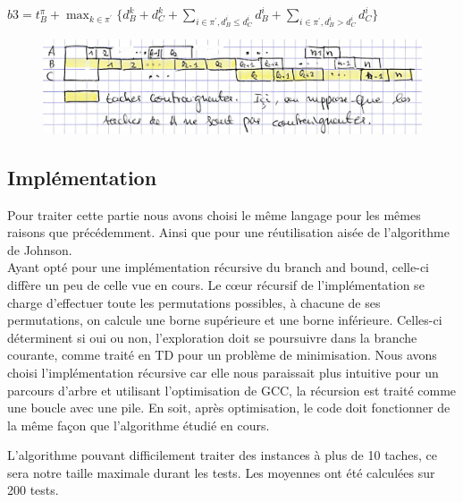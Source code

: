 \documentclass[12pt]{article}
\begin{document}
\begin{center}
 $b3 = t_B^\pi + \displaystyle\max_{k \in \pi^\prime}\{d_B^k + d_C^k + \displaystyle\sum_{i \in \pi^\prime,d_B^i \le d_C^i} d_B^i + \displaystyle\sum_{i \in \pi^\prime,d_B^i > d_C^i} d_C^i\} $\\
\end{center}

\begin{figure}[!ht]
\centering
\centerline{\includegraphics[scale=1]{11.jpg}}
\caption{}
\label{cas41}
\end{figure}

\subsection{Implémentation}

Pour traiter cette partie nous avons choisi le même langage pour les mêmes raisons que précédemment. Ainsi que pour une réutilisation aisée de l'algorithme de Johnson.\\

Ayant opté pour une implémentation récursive du branch and bound, celle-ci diffère un peu de celle vue en cours. Le cœur récursif de l'implémentation se charge d'effectuer toute les permutations possibles, à chacune de ses permutations, on calcule une borne supérieure et une borne inférieure. Celles-ci déterminent si oui ou non, l'exploration doit se poursuivre dans la branche courante, comme traité en TD pour un problème de minimisation. Nous avons choisi l'implémentation récursive car elle nous paraissait plus intuitive pour un parcours d'arbre et utilisant l'optimisation de GCC, la récursion est traité comme une boucle avec une pile. En soit, après optimisation, le code doit fonctionner de la même façon que l'algorithme étudié en cours. 

L'algorithme pouvant difficilement traiter des instances à plus de 10 taches, ce sera notre taille maximale durant les tests. Les moyennes ont été calculées sur 200 tests.
\end{document}
